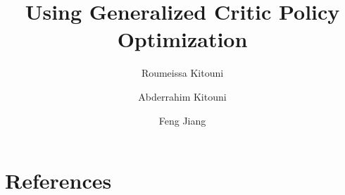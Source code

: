 \documentclass[review]{elsarticle}
\begin{document}
\begin{frontmatter}

\title{Using Generalized Critic Policy Optimization}

\author[hbn]{Roumeissa Kitouni}

\author[cne]{Abderrahim Kitouni}

\author[hbn]{Feng Jiang}

\address[hbn]{Harbin Institute of Technology, 92 Xidazhi Street, Nangang District, Harbin City, Heilongjiang Province, China}
\address[cne]{Université frères Mentouri Constantine 1, route d'Ain El Bey, 25017 Constantine, Algeria}



\end{frontmatter}













\section*{References}


\end{document}
